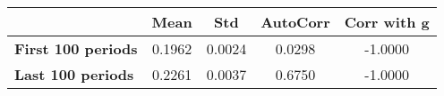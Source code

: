 \begin{tiny}\begin{tabular}{|l|c|c|c|c|}
\hline
&\textbf{Mean}&\textbf{Std}&\textbf{AutoCorr}&\textbf{Corr with g}\\\hline
\textbf{First 100 periods}&0.1962&0.0024&0.0298&-1.0000\\\hline
\textbf{Last 100 periods}&0.2261&0.0037&0.6750&-1.0000\\\hline
\end{tabular}
\end{tiny}